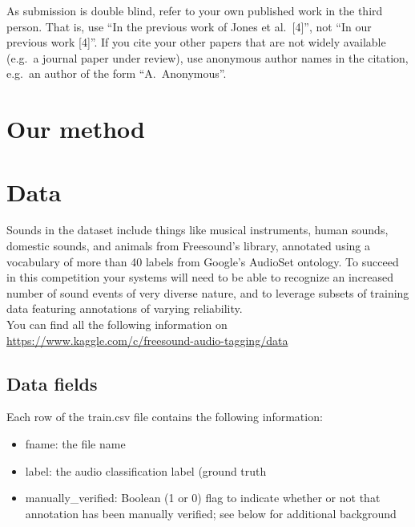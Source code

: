 \documentclass{article} %
\begin{document}
	As submission is double blind, refer to your own published work in the 
	third person. That is, use ``In the previous work of Jones et al.\ [4]'',
	not ``In our previous work [4]''. If you cite your other papers that
	are not widely available (e.g.\ a journal paper under review), use
	anonymous author names in the citation, e.g.\ an author of the
	form ``A.\ Anonymous''. 

\section{Our method}

\section{Data}
	Sounds in the dataset include things like musical instruments, human sounds, domestic sounds, and animals from Freesound’s library, annotated using a vocabulary of more than 40 labels from Google’s AudioSet ontology. To succeed in this competition your systems will need to be able to recognize an increased number of sound events of very diverse nature, and to leverage subsets of training data featuring annotations of varying reliability.\\
	You can find all the following information on \url{https://www.kaggle.com/c/freesound-audio-tagging/data}
	
	\subsection{Data fields}
		Each row of the train.csv file contains the following information:
			\begin{itemize}
			    \item fname: the file name
			    \item label: the audio classification label (ground truth
			    \item manually\_verified: Boolean (1 or 0) flag to indicate whether or not that annotation has been manually verified; see below for additional background
			\end{itemize}
\end{document}
